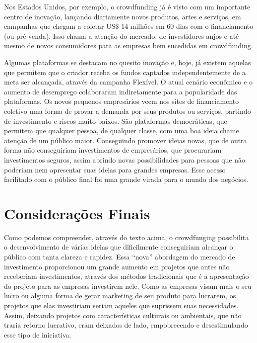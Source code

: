 \documentclass{classe_cn}                 %
\begin{document}
Nos Estados Unidos, por exemplo, o crowdfunding já é visto com um importante centro de inovação, lançando diariamente novos produtos, artes e serviços, em campanhas que chegam a coletar US\$ 14 milhões em 60 dias com o financiamento (ou pré-venda). Isso chama a atenção do mercado, de investidores anjos e até mesmo de novos consumidores para as empresas bem sucedidas em crowdfunding.

Algumas plataformas se destacam no quesito inovação e, hoje, já existem aquelas que permitem que o criador receba os fundos captados independentemente de a meta ser alcançada, através da campanha Flexível. O atual cenário econômico e o aumento de desemprego colaboraram indiretamente para a popularidade das plataformas. Os novos pequenos empresários veem nos sites de financiamento coletivo uma forma de provar a demanda por seus produtos ou serviços, partindo de investimento e riscos muito baixos. São plataformas democráticas, que permitem que qualquer pessoa, de qualquer classe, com uma boa ideia chame atenção de um público maior. Conseguindo promover ideias novas, que de outra forma não conseguiriam investimentos de empresários, que procurariam investimentos seguros, assim abrindo novas possibilidades para pessoas que não poderiam nem apresentar suas ideias para grandes empresas. Esse acesso facilitado com o público final foi uma grande virada para o mundo dos negócios.

\section{Considerações Finais}

Como podemos compreender, através do texto acima, o crowdfunging possibilita o desenvolvimento de várias ideias que dificilmente conseguiriam alcançar o público com tanta clareza e rapidez. Essa “nova” abordagem do mercado de investimento proporcionou um grande aumento em projetos que antes não receberiam investimentos, através dos métodos tradicionais que é a apresentação do projeto para as empresas investirem nele. Como as empresas visam mais o seu lucro ou alguma forma de gerar marketing de seu produto para lucrarem, os projetos que elas investiriam seriam aqueles que suprissem suas necessidades. Assim, deixando projetos com características culturais ou ambientais, que não traria retorno lucrativo, eram deixados de lado, empobrecendo e desestimulando esse tipo de iniciativa.
\end{document}
